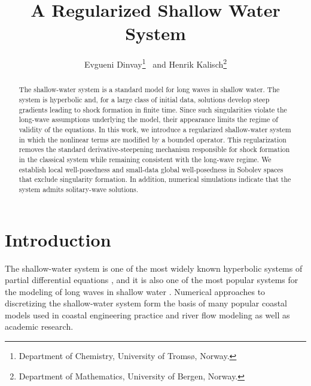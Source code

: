 \documentclass[reqno,12pt,a4paper]{article}
\title{A Regularized Shallow Water System} %
\author{
Evgueni Dinvay\footnote{Department of Chemistry,
University of Troms\o , Norway.} \ and Henrik Kalisch\footnote{Department of Mathematics, University of Bergen, Norway.} 
}
\date{}
\theoremstyle{plain}
\begin{document}
\maketitle



\begin{abstract}
The shallow-water system is a standard model for long waves in shallow water. The system is hyperbolic and, for a large class of initial data, solutions develop steep gradients leading to shock formation in finite time. Since such singularities violate the long-wave assumptions underlying the model, their appearance limits the regime of validity of the equations.
In this work, we introduce a regularized shallow-water system in which the nonlinear terms are modified by a bounded operator. This regularization removes the standard derivative-steepening mechanism responsible for shock formation in the classical system while remaining consistent with the long-wave regime. We establish local well-posedness and small-data global well-posedness in Sobolev spaces that exclude singularity formation. In addition, numerical simulations indicate that the system admits solitary-wave solutions.
\end{abstract}



\section{Introduction}
\setcounter{equation}{0}
%
%
%
\noindent
%
%
The shallow-water system is one of the most widely known hyperbolic systems of 
partial differential equations \cite{Courant_Friedrichs1999}, 
and it is also one of the most popular systems 
for the modeling of long waves in shallow water \cite{Whitham}.
Numerical approaches to 
discretizing the shallow-water system form the basis of many popular coastal models used in coastal engineering practice and river flow modeling as well as academic research. 
 
\end{document}
